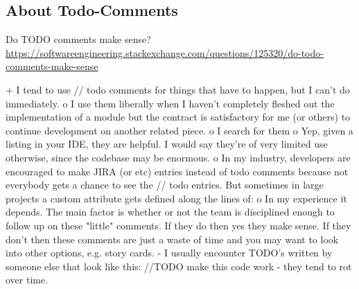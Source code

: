 \subsection{About Todo-Comments}


Do TODO comments make sense? \url{https://softwareengineering.stackexchange.com/questions/125320/do-todo-comments-make-sense}

+ I tend to use // todo comments for things that have to happen, but I can't do immediately.
o I use them liberally when I haven't completely fleshed out the implementation of a module but the contract is satisfactory for me (or others) to continue development on another related piece.
o I search for them
o Yep, given a listing in your IDE, they are helpful. I would say they're of very limited use otherwise, since the codebase may be enormous.
o In my industry, developers are encouraged to make JIRA (or etc) entries instead of todo comments because not everybody gets a chance to see the // todo entries. But sometimes in large projects a custom attribute gets defined along the lines of:
o In my experience it depends. The main factor is whether or not the team is disciplined enough to follow up on these "little" comments. If they do then yes they make sense. If they don't then these comments are just a waste of time and you may want to look into other options, e.g. story cards.
- I usually encounter TODO's written by someone else that look like this: //TODO make this code work
- they tend to rot over time.

